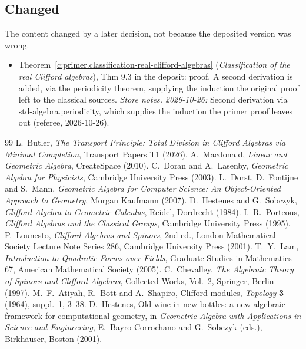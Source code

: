 \documentclass[11pt]{article}
\theoremstyle{definition}
\theoremstyle{plain}
\begin{document}
\subsection*{Changed}
The content changed by a later decision, not because the deposited version was wrong.
\begin{itemize}\setlength{\itemsep}{2pt}
\item Theorem~\ref{c:primer.classification-real-clifford-algebras} (\emph{Classification of the real Clifford algebras}), Thm 9.3 in the deposit: proof. A second derivation is added, via the periodicity theorem, supplying the induction the original proof left to the classical sources. \emph{Store notes.} \emph{2026-10-26:} Second derivation via std-algebra.periodicity, which supplies the induction the primer proof leaves out (referee, 2026-10-26).
\end{itemize}
\begin{thebibliography}{99}
 L.~Butler,
\emph{The Transport Principle: Total Division in Clifford Algebras via Minimal Completion},
Transport Papers T1 (2026).
 A.~Macdonald,
\emph{Linear and Geometric Algebra},
CreateSpace (2010).
 C.~Doran and A.~Lasenby,
\emph{Geometric Algebra for Physicists},
Cambridge University Press (2003).
 L.~Dorst, D.~Fontijne and S.~Mann,
\emph{Geometric Algebra for Computer Science: An Object-Oriented Approach to Geometry},
Morgan Kaufmann (2007).
 D.~Hestenes and G.~Sobczyk,
\emph{Clifford Algebra to Geometric Calculus},
Reidel, Dordrecht (1984).
 I.~R.~Porteous,
\emph{Clifford Algebras and the Classical Groups},
Cambridge University Press (1995).
 P.~Lounesto,
\emph{Clifford Algebras and Spinors}, 2nd ed.,
London Mathematical Society Lecture Note Series 286, Cambridge University Press (2001).
 T.~Y.~Lam,
\emph{Introduction to Quadratic Forms over Fields},
Graduate Studies in Mathematics 67, American Mathematical Society (2005).
 C.~Chevalley,
\emph{The Algebraic Theory of Spinors and Clifford Algebras},
Collected Works, Vol.~2, Springer, Berlin (1997).
 M.~F.~Atiyah, R.~Bott and A.~Shapiro,
Clifford modules,
\emph{Topology} \textbf{3} (1964), suppl.~1, 3--38.
 D.~Hestenes,
Old wine in new bottles: a new algebraic framework for computational geometry,
in \emph{Geometric Algebra with Applications in Science and Engineering},
E.~Bayro-Corrochano and G.~Sobczyk (eds.), Birkh\"auser, Boston (2001).
\end{thebibliography}
\end{document}
